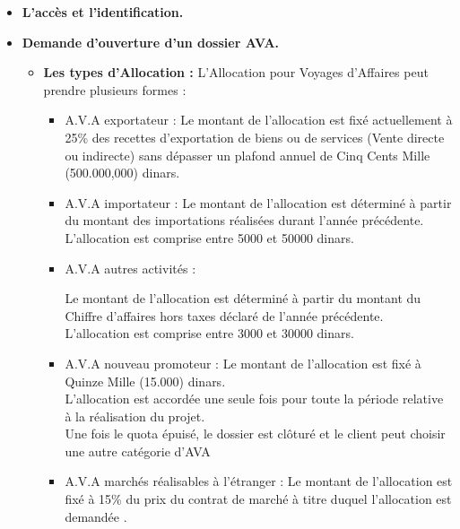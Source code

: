 \begin{itemize}
\item \textbf{L'accès et l'identification.}

 

\item \textbf{Demande d'ouverture d'un dossier AVA.}

\begin{itemize}
\item \textbf{Les types d'Allocation :}
L'Allocation pour Voyages d'Affaires peut prendre plusieurs formes :

\begin{itemize}
\item A.V.A exportateur : 
Le montant de l'allocation est fixé actuellement à 25\% des recettes d'exportation de biens ou de services (Vente directe ou indirecte)
sans dépasser un plafond annuel de Cinq Cents Mille (500.000,000) dinars.

\item A.V.A importateur :
Le montant de l'allocation est déterminé à partir du montant des importations réalisées durant l'année précédente.\\
L'allocation est comprise entre 5000 et 50000 dinars.

\item A.V.A autres activités :

Le montant de l'allocation est déterminé à partir du montant du Chiffre d'affaires hors taxes déclaré de l'année précédente.\\
L'allocation est comprise entre 3000 et 30000 dinars.

\item A.V.A nouveau promoteur :
Le montant de l'allocation est fixé à Quinze Mille (15.000) dinars.\\
L'allocation est accordée une seule fois pour toute la période relative à la réalisation du projet.\\
Une fois le quota épuisé, le dossier est clôturé et le client peut choisir une autre catégorie d'AVA

\item A.V.A marchés réalisables à l'étranger :
Le montant de l'allocation est fixé à 15\% du prix du contrat de marché à titre duquel l'allocation est demandée .

\end{itemize} %
\end{itemize} %



\end{itemize}
